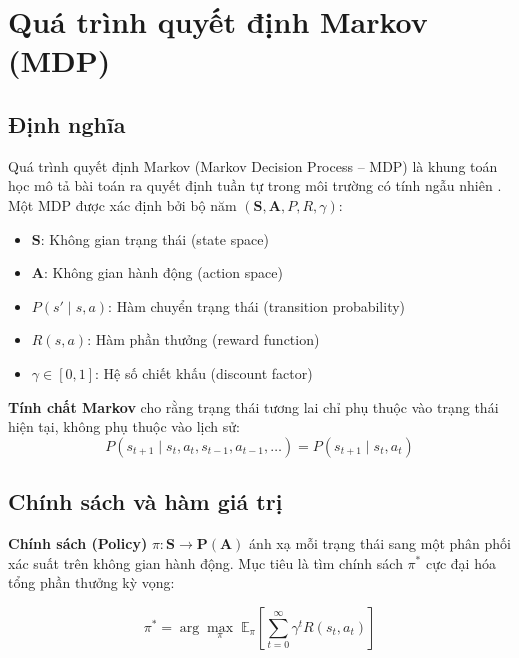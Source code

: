 \section{Quá trình quyết định Markov (MDP)}

\subsection{Định nghĩa}

Quá trình quyết định Markov (Markov Decision Process -- MDP) là khung toán học mô tả bài toán ra quyết định tuần tự trong môi trường có tính ngẫu nhiên \cite{puterman1994mdp}. Một MDP được xác định bởi bộ năm $(\mathbf{S}, \mathbf{A}, P, R, \gamma)$:

\begin{itemize}
    \item $\mathbf{S}$: Không gian trạng thái (state space)
    \item $\mathbf{A}$: Không gian hành động (action space)
    \item $P(s' \mid s, a)$: Hàm chuyển trạng thái (transition probability)
    \item $R(s, a)$: Hàm phần thưởng (reward function)
    \item $\gamma \in [0, 1]$: Hệ số chiết khấu (discount factor)
\end{itemize}

\noindent \textbf{Tính chất Markov} cho rằng trạng thái tương lai chỉ phụ thuộc vào trạng thái hiện tại, không phụ thuộc vào lịch sử:
\begin{equation}
    P(s_{t+1} \mid s_t, a_t, s_{t-1}, a_{t-1}, \ldots) = P(s_{t+1} \mid s_t, a_t)
\end{equation}

\subsection{Chính sách và hàm giá trị}

\textbf{Chính sách (Policy)} $\pi: \mathbf{S} \to \mathbf{P}(\mathbf{A})$ ánh xạ mỗi trạng thái sang một phân phối xác suất trên không gian hành động. Mục tiêu là tìm chính sách $\pi^*$ cực đại hóa tổng phần thưởng kỳ vọng:

\begin{equation}
    \pi^* = \arg\max_{\pi} \; \mathbb{E}_{\pi}\left[\sum_{t=0}^{\infty} \gamma^t R(s_t, a_t)\right]
    \label{eq:optimal_policy}
\end{equation}

